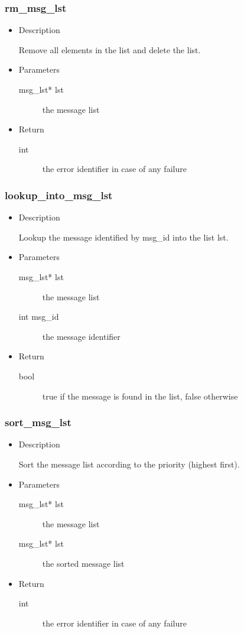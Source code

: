 \subsubsection{rm\_msg\_lst}
\begin{itemize}
  \item{Description}

	 Remove all elements in the list and delete the list.
  \item{Parameters}
	 \begin{description}
		\item[msg\_lst* lst] the message list
	 \end{description}
  \item{Return}
	 \begin{description}
		\item[int] the error identifier in case of any failure
	 \end{description}
\end{itemize}

\subsubsection{lookup\_into\_msg\_lst}
\begin{itemize}
  \item{Description}

	 Lookup the message identified by msg\_id into the list lst.
  \item{Parameters}
	 \begin{description}
		\item[msg\_lst* lst] the message list
		\item[int msg\_id] the message identifier
	 \end{description}
  \item{Return}
	 \begin{description}
		\item[bool] true if the message is found in the list, false otherwise
	 \end{description}
\end{itemize}

\subsubsection{sort\_msg\_lst}
\begin{itemize}
  \item{Description}

	 Sort the message list according to the priority (highest first).
  \item{Parameters}
	 \begin{description}
		\item[msg\_lst* lst] the message list
		\item[msg\_lst* lst] the sorted message list
	 \end{description}
  \item{Return}
	 \begin{description}
		\item[int] the error identifier in case of any failure
	 \end{description}
\end{itemize}

